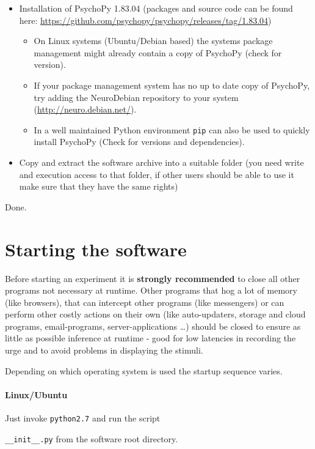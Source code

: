 \documentclass[12pt,a4paper]{book}
\begin{document}
\begin{itemize}
	\item Installation of PsychoPy 1.83.04 (packages and source code can be found here: \url{https://github.com/psychopy/psychopy/releases/tag/1.83.04})
	\begin{itemize}
		\item On Linux systems (Ubuntu/Debian based) the systems package management  might already contain a copy of PsychoPy (check for version).
		\item If your package management system has no up to date copy of PsychoPy, try adding the NeuroDebian repository to your system (\url{http://neuro.debian.net/}).
		\item In a well maintained Python environment \verb|pip| can also be used to quickly install PsychoPy (Check for versions and dependencies).
	\end{itemize}
	\item Copy and extract the software archive into a suitable folder (you need write and execution access to that folder, if other users should be able to use it make sure that they have the same rights)
\end{itemize} 

Done.

\section{Starting the software}

Before starting an experiment it is \textbf{strongly recommended} to close all other programs not necessary at runtime. Other programs that hog a lot of memory (like browsers), that can intercept other programs (like messengers) or can perform other costly actions on their own (like auto-updaters, storage and cloud programs, email-programs, server-applications \dots) should be closed to ensure as little as possible inference at runtime - good for low latencies in recording the urge and to avoid problems in displaying the stimuli.

Depending on which operating system is used the startup sequence varies.

\paragraph{Linux/Ubuntu}

Just invoke \verb|python2.7| and run the script 

\verb|__init__.py| from the software root directory.
\end{document}

